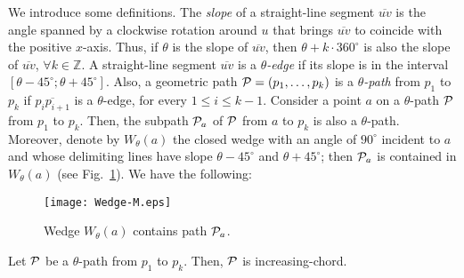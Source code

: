 \documentclass{llncs}
\begin{document}
We introduce some definitions. The {\em slope} of a straight-line segment $\overline{uv}$ is the angle spanned by a clockwise rotation around $u$ that brings $\overline{uv}$ to coincide with the positive $x$-axis. Thus, if $\theta$ is the slope of $\overline{uv}$, then $\theta+k\cdot 360^{\circ}$ is also the slope of $\overline{uv}$, $\forall k\in \mathbb{Z}$. A straight-line segment $\overline{uv}$ is a {\em $\theta$-edge} if its slope is in the interval $[\theta-45^\circ;\theta+45^\circ]$. Also, a geometric path ${\cal P}=(p_1, \dots, p_k)$ is a {\em $\theta$-path} from $p_1$ to $p_k$ if $\overline{p_ip_{i+1}}$ is a $\theta$-edge, for every $1\leq i\leq k-1$. Consider a point $a$ on a $\theta$-path ${\cal P}$ from $p_1$ to $p_k$. Then, the subpath ${\cal P}_a$ of ${\cal P}$ from $a$ to $p_k$ is also a $\theta$-path. Moreover, denote by $W_\theta(a)$ the closed wedge with an angle of $90^\circ$ incident to $a$ and whose delimiting lines have slope $\theta-45^\circ$ and $\theta+45^\circ$; then ${\cal P}_a$ is contained in $W_\theta(a)$ (see Fig.~\ref{fig:wedges}). We have the following:

\begin{figure}[tb]
\begin{center}
\mbox{\texttt{[image: Wedge-M.eps]}}
\caption{Wedge $W_\theta(a)$ contains path ${\cal P}_a$.}
\label{fig:wedges}
\end{center}
\end{figure}

\begin{lemma} \label{le:theta-path-approaching}
Let $\cal P$ be a $\theta$-path from $p_1$ to $p_k$. Then, $\cal P$ is increasing-chord.
\end{lemma}
\end{document}
